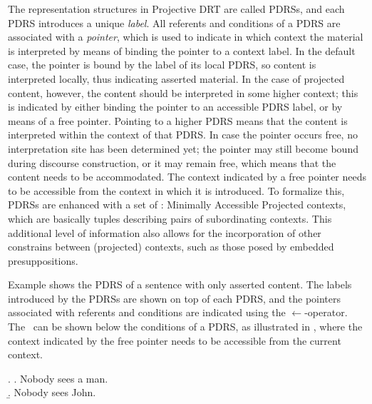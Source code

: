 The representation structures in Projective DRT are called PDRSs, and each
PDRS introduces a unique \emph{label}.  All referents and conditions of
a PDRS are associated with a \emph{pointer}, which is used to indicate in
which context the material is interpreted by means of binding the pointer to
a context label.  In the default case, the pointer is bound by the label of
its local PDRS, so content is interpreted locally, thus indicating asserted
material. In the case of projected content, however, the content should be
interpreted in some higher context; this is indicated by either binding the
pointer to an accessible PDRS label, or by means of a free pointer. Pointing
to a higher PDRS means that the content is interpreted within the context of
that PDRS. In case the pointer occurs free, no interpretation site has been
determined yet; the pointer may still become bound during discourse
construction, or it may remain free, which means that the content needs to
be accommodated. The context indicated by a free pointer needs to be
accessible from the context in which it is introduced.  To formalize this,
PDRSs are enhanced with a set of \MAPs: Minimally Accessible Projected
contexts, which are basically tuples describing pairs of subordinating
contexts. This additional level of information also allows for the
incorporation of other constrains between (projected) contexts, such as
those posed by embedded presuppositions. 

Example \Next[a] shows the PDRS of a sentence with only asserted content.
The labels introduced by the PDRSs are shown on top of each PDRS, and the
pointers associated with referents and conditions are indicated using the
$\gets$-operator. The \MAPs~can be shown below the conditions of a PDRS, as
illustrated in \Next[b], where the context indicated by the free pointer
needs to be accessible from the current context.

\begin{flushleft}
\begin{minipage}{0.85\linewidth}
\begin{multicols}{2}
\ex. \a. Nobody sees a man.\\
\b. Nobody sees John.\\

\end{multicols}
\end{minipage}\\
\end{flushleft}

